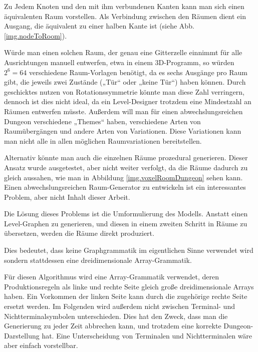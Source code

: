 Zu Jedem Knoten und den mit ihm verbundenen Kanten kann man sich einen äquivalenten Raum vorstellen. Als Verbindung zwischen den Räumen dient ein Ausgang, die äquivalent zu einer halben Kante ist (siehe Abb. \ref{img.nodeToRoom}).


Würde man einen solchen Raum, der genau eine Gitterzelle einnimmt für alle Ausrichtungen manuell entwerfen, etwa in einem 3D-Programm, so würden $ 2^6 = 64 $ verschiedene Raum-Vorlagen benötigt, da es sechs Ausgänge pro Raum gibt, die jeweils zwei Zustände („Tür“ oder „keine Tür“) haben können. Durch geschicktes nutzen von Rotationssymmetrie könnte man diese Zahl verringern, dennoch ist dies nicht ideal, da ein Level-Designer trotzdem eine Mindestzahl an Räumen entwerfen müsste. Außerdem will man für einen abwechslungsreichen Dungeon verschiedene „Themes“ haben, verschiedene Arten von Raumübergängen und andere Arten von Variationen. Diese Variationen kann man nicht alle in allen möglichen Raumvariationen bereitstellen. 

Alternativ könnte man auch die einzelnen Räume prozedural generieren. Dieser Ansatz wurde ausgetestet, aber nicht weiter verfolgt, da die Räume dadurch zu gleich aussahen, wie man in Abbildung \ref{img.voxelRoomDungeon} sehen kann. Einen abwechslungsreichen Raum-Generator zu entwickeln ist ein interessantes Problem, aber nicht Inhalt dieser Arbeit.


Die Lösung dieses Problems ist die Umformulierung des Modells. Anstatt einen Level-Graphen zu generieren, und diesen in einem zweiten Schritt in Räume zu übersetzen, werden die Räume direkt produziert. 

Dies bedeutet, dass keine Graphgrammatik im eigentlichen Sinne verwendet wird sondern stattdessen eine dreidimensionale Array-Grammatik. 

Für diesen Algorithmus wird eine Array-Grammatik verwendet, deren Produktionsregeln als linke und rechte Seite gleich große dreidimensionale Arrays haben. Ein Vorkommen der linken Seite kann durch die zugehörige rechte Seite ersetzt werden. Im Folgenden wird außerdem nicht zwischen Terminal- und Nichtterminalsymbolen unterschieden. Dies hat den Zweck, dass man die Generierung zu jeder Zeit abbrechen kann, und trotzdem eine korrekte Dungeon-Darstellung hat. Eine Unterscheidung von Terminalen und Nichtterminalen wäre aber einfach vorstellbar.

